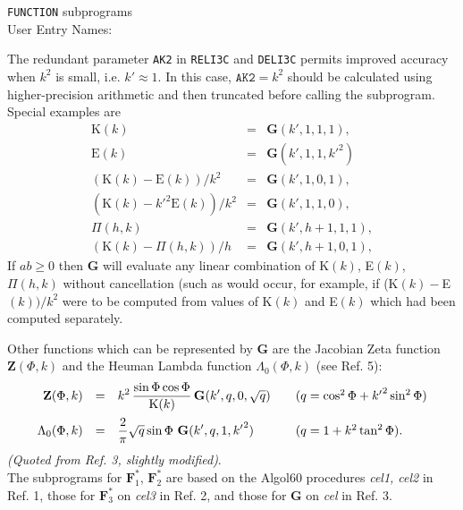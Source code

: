 \documentclass[]{article}
\begin{document}
{\tt FUNCTION} subprograms \\
User Entry Names:

The redundant parameter {\tt AK2} in {\tt RELI3C} and {\tt DELI3C}
permits improved accuracy when $k^2$ is small, i.e. $k' \approx 1$. In
this case, $\mathtt{AK2} = k^2$ should be calculated using
higher-precision arithmetic and then truncated before calling the
subprogram.
Special examples are
$$\begin{array}{rcl}
\mathrm{K}(k)                           & = & \mathbf{G}(k',1,1,1), \\[1mm]
\mathrm{E}(k)                           & = & \mathbf{G}(k',1,1,{k'}^2)\\[2mm]
(\mathrm{K}(k)-\mathrm{E}(k))/k^2       & = & \mathbf{G}(k',1,0,1), \\[3mm]
(\mathrm{K}(k)-{k'}^2\mathrm{E}(k))/k^2 & = & \mathbf{G}(k',1,1,0), \\[4mm]
\Pi(h,k)                                & = & \mathbf{G}(k',h+1,1,1),\\[5mm]
(\mathrm{K}(k)-\Pi(h,k))/h              & = & \mathbf{G}(k',h+1,0,1),
\end{array} $$
If $ab \ge 0$ then $\mathbf{G}$ will evaluate any linear
combination of K$(k)$, E$(k)$, $\Pi(h,k)$ without cancellation
(such as would occur, for example, if (K$(k)-$E$(k))/k^2$ were to be
computed from values of K$(k)$ and E$(k)$ which had been computed
separately.

Other functions which can be represented by $\mathbf{G}$ are the Jacobian
Zeta function $\mathbf{Z}(\Phi,k)$ and the Heuman Lambda function
$\Lambda_0(\Phi,k)$ (see Ref. 5):
$$\begin{array}{rcl@{\qquad}l}
\mathbf{Z}(\Phi,k) & = & \displaystyle k^2 \,
\frac{\sin \Phi \cos \Phi}{\mathrm{K}(k)} \, \mathbf{G}(k',q,0,\sqrt{q})
& (q = \cos^2 \Phi + {k'}^2 \sin^2 \Phi) \\[4mm]
\Lambda_0(\Phi,k) & = & \displaystyle \frac{2}{\pi}
\sqrt{q} \sin \Phi \ \mathbf{G}(k',q,1,{k'}^2) &
(q = 1 + k^2 \tan^2 \Phi).
\end{array} $$
{\it (Quoted from Ref. 3, slightly modified)}.\\

The subprograms for $\mathbf{F}_1^*$, $\mathbf{F}_2^*$ are based on the
Algol60 procedures {\it cel1, cel2} in Ref. 1, those for
$\mathbf{F}_3^*$ on {\it cel3} in Ref. 2, and those for $\mathbf{G}$
on {\it cel} in Ref. 3.
\end{document}
